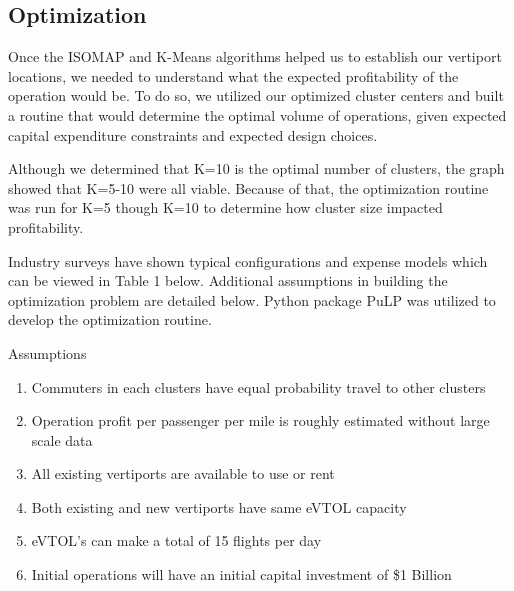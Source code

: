 \documentclass{article}
\begin{document}
\subsection{Optimization}

Once the ISOMAP and K-Means algorithms helped us to establish our vertiport locations, we needed to understand what the expected profitability of the operation would be. To do so, we utilized our optimized cluster centers and built a routine that would determine the optimal volume of operations, given expected capital expenditure constraints and expected design choices. 

Although we determined that K=10 is the optimal number of clusters, the graph showed that K=5-10 were all viable. Because of that, the optimization routine was run for K=5 though K=10 to determine how cluster size impacted profitability.

Industry surveys have shown typical configurations and expense models which can be viewed in Table 1 below. Additional assumptions in building the optimization problem are detailed below. Python package PuLP was utilized to develop the optimization routine.

Assumptions
\begin{enumerate}
  \item Commuters in each clusters have equal probability travel to other clusters
  \item Operation profit per passenger per mile is roughly estimated without large scale data
  \item All existing vertiports are available to use or rent
  \item Both existing and new vertiports have same eVTOL capacity
  \item eVTOL's can make a total of 15 flights per day
  \item Initial operations will have an initial capital investment of \$1 Billion
\end{enumerate}
\end{document}
